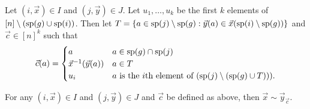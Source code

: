 \documentclass[../paper.tex]{subfiles}
\begin{document}


Let $(i, \vec{x}) \in I$ and $(j, \vec{y}) \in J$. Let $u_1, \ldots , u_k$ be
the first $k$ elements of $[n] \setminus (\text{sp}(g) \cup \text{sp}(i))$. Then let
$T = \{a \in \text{sp}(j) \setminus \text{sp}(g) : \vec{y}(a) \in \vec{x}(\text{sp}(i)
\setminus \text{sp}(g))\}$ and $\vec{c} \in [n]^k$ such that
\[
  \vec{c} (a) =
  \begin{cases}
    a & a \in \text{sp}(g) \cap \text{sp}(j)\\
    \vec{x}^{-1}(\vec{y}(a)) & a \in T\\
    u_{i} & \text{$a$ is the $i$th element of $(\text{sp}(j) \setminus (\text{sp}(g)
      \cup T)))$}.
  \end{cases}
\]
\begin{lem}
  For any $(i, \vec{x}) \in I$ and $(j, \vec{y}) \in J$ and $\vec{c}$ be defined
  as above, then $\vec{x} \sim \vec{y}_{\vec{c}}$.
\end{lem}
\end{document}
